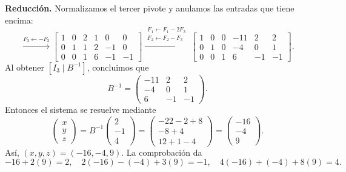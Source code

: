\documentclass[10pt,a4]{examenEPN0}
\begin{document}
\noindent\textbf{Reducción.} Normalizamos el tercer pivote y anulamos
las entradas que tiene encima:
\[
    \xrightarrow{F_3\leftarrow-F_3}
    \left[\begin{array}{ccc|ccc}
        1&0&2&1&0&0\\0&1&1&2&-1&0\\0&0&1&6&-1&-1
    \end{array}\right]
    \xrightarrow{\substack{F_1\leftarrow F_1-2F_3\\F_2\leftarrow F_2-F_3}}
    \left[\begin{array}{ccc|ccc}
        1&0&0&-11&2&2\\0&1&0&-4&0&1\\0&0&1&6&-1&-1
    \end{array}\right].
\]
Al obtener $[I_3\mid B^{-1}]$, concluimos que
\[
    B^{-1}=\begin{pmatrix}-11&2&2\\-4&0&1\\6&-1&-1\end{pmatrix}.
\]
Entonces el sistema se resuelve mediante
\[
    \begin{pmatrix}x\\y\\z\end{pmatrix}
    =B^{-1}\begin{pmatrix}2\\-1\\4\end{pmatrix}
    =\begin{pmatrix}-22-2+8\\-8+4\\12+1-4\end{pmatrix}
    =\begin{pmatrix}-16\\-4\\9\end{pmatrix}.
\]
Así, $\boxed{(x,y,z)=(-16,-4,9)}$. La comprobación da
\[
    -16+2(9)=2,\quad 2(-16)-(-4)+3(9)=-1,\quad
    4(-16)+(-4)+8(9)=4.
\]
\end{document}
